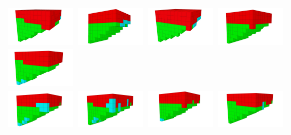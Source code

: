 \begin{figure}[t!]
\centering
\begin{subfigure}[b]{1.0\textwidth}
\includegraphics[width=0.19\textwidth]{../Figures/Robots/f_4_g_100.jpg}
\includegraphics[width=0.19\textwidth]{../Figures/Robots/f_4_g_200.jpg}
\includegraphics[width=0.19\textwidth]{../Figures/Robots/f_4_g_300.jpg}
\includegraphics[width=0.19\textwidth]{../Figures/Robots/f_4_g_400.jpg}
\includegraphics[width=0.19\textwidth]{../Figures/Robots/f_4_g_500.jpg}\\
\includegraphics[width=0.19\textwidth]{../Figures/Robots/f_4_g_600.jpg}
\includegraphics[width=0.19\textwidth]{../Figures/Robots/f_4_g_700.jpg}
\includegraphics[width=0.19\textwidth]{../Figures/Robots/f_4_g_800.jpg}
\includegraphics[width=0.19\textwidth]{../Figures/Robots/f_4_g_900.jpg}

\end{subfigure}
\end{figure}
